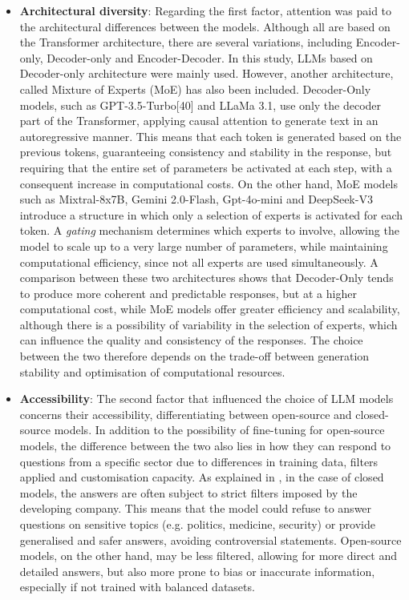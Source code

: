 \begin{itemize}
    \item \textbf{Architectural diversity}: Regarding the first factor, attention was paid to the architectural differences between the models. Although all are based on the Transformer architecture, there are several variations, including Encoder-only, Decoder-only and Encoder-Decoder. In this study, LLMs based on Decoder-only architecture were mainly used.
    However, another architecture, called Mixture of Experts (MoE)\cite{MoE} has also been included. Decoder-Only models, such as GPT-3.5-Turbo[40] and LLaMa 3.1, use only the decoder part of the Transformer, applying causal attention to generate text in an autoregressive manner.
    This means that each token is generated based on the previous tokens, guaranteeing consistency and stability in the response, but requiring that the entire set of parameters be activated at each step, with a consequent increase in computational costs.
    On the other hand, MoE models such as Mixtral-8x7B, Gemini 2.0-Flash, Gpt-4o-mini and DeepSeek-V3 introduce a structure in which only a selection of experts is activated for each token. 
    A \textit{gating} mechanism determines which experts to involve, allowing the model to scale up to a very large number of parameters, while maintaining computational efficiency, since not all experts are used simultaneously.
    A comparison between these two architectures shows that Decoder-Only tends to produce more coherent and predictable responses, but at a higher computational cost, while MoE models offer greater efficiency and scalability, although there is a possibility of variability in the selection of experts, which can influence the quality and consistency of the responses. The choice between the two therefore depends on the trade-off between generation stability and optimisation of computational resources.
    \item \textbf{Accessibility}: The second factor that influenced the choice of LLM models concerns their accessibility, differentiating between open-source and closed-source models. In addition to the possibility of fine-tuning for open-source models, the difference between the two also lies in how they can respond to questions from a specific sector due to differences in training data, filters applied and customisation capacity.
    As explained in \cite{10.1145/3306618.3314244}, in the case of closed models, the answers are often subject to strict filters imposed by the developing company. This means that the model could refuse to answer questions on sensitive topics (e.g. politics, medicine, security) or provide generalised and safer answers, avoiding controversial statements. Open-source models, on the other hand, may be less filtered, allowing for more direct and detailed answers, but also more prone to bias or inaccurate information, especially if not trained with balanced datasets.

\end{itemize}
